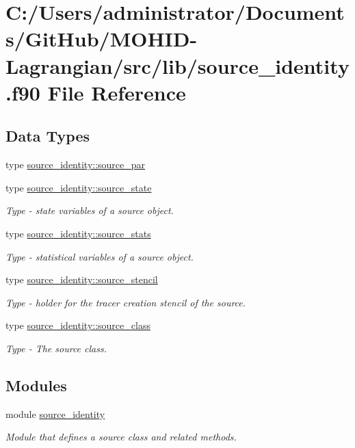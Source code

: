 \hypertarget{source__identity_8f90}{}\section{C\+:/\+Users/administrator/\+Documents/\+Git\+Hub/\+M\+O\+H\+I\+D-\/\+Lagrangian/src/lib/source\+\_\+identity.f90 File Reference}
\label{source__identity_8f90}
\subsection*{Data Types}
\begin{DoxyCompactItemize}
\item 
type \mbox{\hyperlink{structsource__identity_1_1source__par}{source\+\_\+identity\+::source\+\_\+par}}
\item 
type \mbox{\hyperlink{structsource__identity_1_1source__state}{source\+\_\+identity\+::source\+\_\+state}}
\begin{DoxyCompactList}\small\item\em Type -\/ state variables of a source object. \end{DoxyCompactList}\item 
type \mbox{\hyperlink{structsource__identity_1_1source__stats}{source\+\_\+identity\+::source\+\_\+stats}}
\begin{DoxyCompactList}\small\item\em Type -\/ statistical variables of a source object. \end{DoxyCompactList}\item 
type \mbox{\hyperlink{structsource__identity_1_1source__stencil}{source\+\_\+identity\+::source\+\_\+stencil}}
\begin{DoxyCompactList}\small\item\em Type -\/ holder for the tracer creation stencil of the source. \end{DoxyCompactList}\item 
type \mbox{\hyperlink{structsource__identity_1_1source__class}{source\+\_\+identity\+::source\+\_\+class}}
\begin{DoxyCompactList}\small\item\em Type -\/ The source class. \end{DoxyCompactList}\end{DoxyCompactItemize}
\subsection*{Modules}
\begin{DoxyCompactItemize}
\item 
module \mbox{\hyperlink{namespacesource__identity}{source\+\_\+identity}}
\begin{DoxyCompactList}\small\item\em Module that defines a source class and related methods. \end{DoxyCompactList}\end{DoxyCompactItemize}
